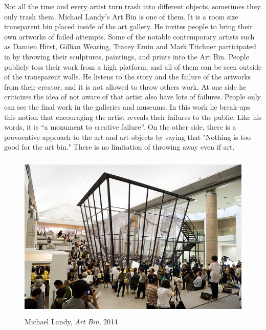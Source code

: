 Not all the time and every artist turn trash into different objects, sometimes they only trash them. Michael Landy's Art Bin is one of them. It is a room size transparent bin placed inside of the art gallery. He invites people to bring their own artworks of failed attempts. Some of the notable contemporary artists such as Damien Hirst, Gillian Wearing, Tracey Emin and Mark Titchner participated in by throwing their sculptures, paintings, and prints into the Art Bin. People publicly toss their work from a high platform, and all of them can be seen outside of the transparent walls. He listens to the story and the failure of the artworks from their creator, and it is not allowed to throw others work. At one side he criticizes the idea of not aware of that artist also have lots of failures. People only can see the final work in the galleries and museums. In this work he break-ups this notion that encouraging the artist reveals their failures to the public. Like his words, it is “a monument to creative failure”. On the other side, there is a provocative approach to the art and art objects by saying that "Nothing is too good for the art bin." There is no limitation of throwing away even if art. 

\begin{figure}[h!]
  \centering
  \includegraphics[height=8cm]{graphics/MichaelLandy_ArtBin.jpg}
  \caption{Michael Landy, \textit{Art Bin}, 2014}
  \label{fig:MichaelLandy_ArtBin}
\end{figure}

